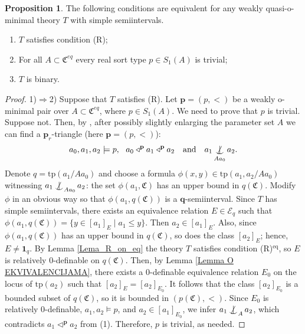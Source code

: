 \documentclass{amsart}
\theoremstyle{definition}
\newtheorem{Proposition}[Theorem]{Proposition}
\theoremstyle{definition}
\def\notind#1#2{#1\setbox0=\hbox{$#1x$}\kern\wd0
\hbox to 0pt{\mathchardef\nn=12854\hss$#1\nn$\kern1.4\wd0\hss}
\hbox to 0pt{\hss$#1\mid$\hss}\lower.9\ht0 \hbox to 0pt{\hss$#1\smile$\hss}\kern\wd0}
\def\dep{\mathop{\mathpalette\notind{}}}
\newcommand{\Mon}{\mathfrak C}
\newcommand{\Moneq}{\mathfrak C^{eq}}
\newcommand{\tp}{\mathrm{tp}}
\begin{document}
\begin{Proposition}\label{Prop_equivalents_of_R} 
The following conditions are equivalent for any weakly quasi-o-minimal theory $T$ with simple semiintervals.
\begin{enumerate}[\hspace{10pt} 1)]
    \item $T$ satisfies condition (R);
    \item For all $A\subset \Moneq$ every real sort type $p\in S_1(A)$ is trivial;
    \item $T$ is binary.
\end{enumerate}
\end{Proposition}
\begin{proof}
1)$\Rightarrow$2) Suppose that $T$ satisfies (R). Let $\mathbf p=(p,<)$ be a weakly o-minimal pair over $A\subset \Moneq$, where $p\in S_1(A)$. We need to prove that $p$ is trivial. Suppose not. Then, by \cite[Remark 5.8]{MTwqom1}, after possibly slightly enlarging the parameter set $A$ we can find a $\mathbf p_r$-triangle (here $\mathbf p=(p,<)$): 
\setcounter{equation}{0}   
\begin{equation}  a_0,a_1,a_2\models p, \ \ a_0\triangleleft^{\mathbf p} a_1 \triangleleft^{\mathbf p}a_2 \ \ \text{ and }  \ \ a_1\dep_{Aa_0} a_2.
\end{equation}
Denote $q=\tp(a_1/Aa_0)$ and choose a formula $\phi(x,y)\in \tp(a_1,a_2/Aa_0)$ witnessing $a_1\dep_{Aa_0} a_2$:  the set $\phi(a_1,\Mon)$ has an upper bound in $q(\Mon)$. Modify $\phi$ in an obvious way so that $\phi(a_1, q(\Mon))$ is a $\mathbf q$-semiinterval. Since $T$ has simple semiintervals, there exists an equivalence relation $E\in \mathcal E_q$ such that  $\phi(a_1, q(\Mon))=\{y\in [a_1]_E\mid a_1\leqslant y\}$. Then $a_2\in[a_1]_E$. Also, since $\phi(a_1,q(\Mon))$ has an upper bound in $q(\Mon)$, so does the class $[a_2]_E$; hence, $E\neq \mathbf 1_q$. 
By Lemma \ref{Lema_R_on_eq} the theory $T$ satisfies condition (R)$^\mathrm{eq}$,  so $E$ is relatively 0-definable on $q(\Mon)$. Then, by Lemma \ref{Lemma O EKVIVALENCIJAMA}, there exists a $0$-definable equivalence relation $E_0$ on the locus of $\tp(a_2)$ such that $[a_2]_E=[a_2]_{E_0}$. It follows that the class $[a_2]_{E_0}$ is a bounded subset of $q(\Mon)$, so it is bounded in $(p(\Mon),<)$. Since $E_0$ is relatively $0$-definable, $a_1,a_2\models p$, and $a_2\in[a_1]_{E_0}$, we infer $a_1\dep_A a_2$, which contradicts $a_1 \triangleleft^{\mathbf p} a_2$ from (1). Therefore, $p$ is trivial, as needed.  


\end{proof}
\end{document}
